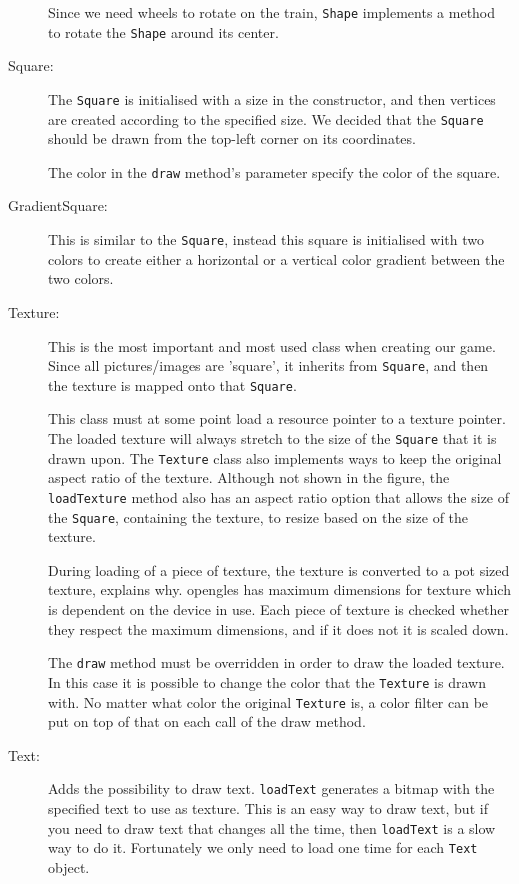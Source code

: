 \begin{description}
Since we need wheels to rotate on the train, \lstinline|Shape| implements a method to rotate the \lstinline|Shape| around its center.

\item[Square:] The \lstinline|Square| is initialised with a size in the constructor, and then vertices are created according to the specified size. We decided that the \lstinline|Square| should be drawn from the top-left corner on its coordinates.

The color in the \lstinline|draw| method's parameter specify the color of the square.

\item[GradientSquare:] This is similar to the \lstinline|Square|, instead this square is initialised with two colors to create either a horizontal or a vertical color gradient between the two colors.

\item[Texture:] This is the most important and most used class when creating our game. Since all pictures/images are 'square', it inherits from \lstinline|Square|, and then the texture is mapped onto that \lstinline|Square|.

This class must at some point load a resource pointer to a texture pointer. The loaded texture will always stretch to the size of the \lstinline|Square| that it is drawn upon. The \lstinline|Texture| class also implements ways to keep the original aspect ratio of the texture. Although not shown in the figure, the \lstinline|loadTexture| method also has an aspect ratio option that allows the size of the \lstinline|Square|, containing the texture, to resize based on the size of the texture.

During loading of a piece of texture, the texture is converted to a \ac{pot} sized texture,  explains why. \ac{opengles} has maximum dimensions for texture which is dependent on the device in use. Each piece of texture is checked whether they respect the maximum dimensions, and if it does not it is scaled down.

The \lstinline|draw| method must be overridden in order to draw the loaded texture. In this case it is possible to change the color that the \lstinline|Texture| is drawn with. No matter what color the original \lstinline|Texture| is, a color filter can be put on top of that on each call of the draw method.

\item[Text:] Adds the possibility to draw text. \lstinline|loadText| generates a bitmap with the specified text to use as texture. This is an easy way to draw text, but if you need to draw text that changes all the time, then \lstinline|loadText| is a slow way to do it. Fortunately we only need to load one time for each \lstinline|Text| object.


\end{description}
